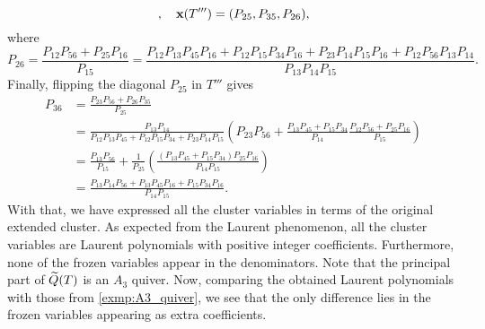 \begin{example}
\begin{equation*}
\begin{tikzcd}[sep=tiny, cells={nodes={font=\footnotesize}}]
		\end{tikzcd}
		,\quad \bx(T''') = (P_{25}, P_{35}, P_{26}),
	\end{equation*}
	where
	\begin{equation*}
		P_{26} = \frac{P_{12}P_{56} + P_{25}P_{16}}{P_{15}} = \frac{P_{12}P_{13}P_{45}P_{16} + P_{12}P_{15}P_{34}P_{16}+P_{23}P_{14}P_{15}P_{16} + P_{12}P_{56}P_{13}P_{14}}{P_{13}P_{14}P_{15}}.
	\end{equation*}
	Finally, flipping the diagonal $P_{25}$ in $T'''$ gives
	\begin{align*}
		P_{36}
		 & = \frac{P_{23}P_{56} + P_{26}P_{35}}{P_{25}}                                                                                                                                                      \\
		 & = \frac{P_{13}P_{14}}{P_{12}P_{13}P_{45} + P_{12}P_{15}P_{34}+P_{23}P_{14}P_{15}}\left(P_{23}P_{56} + \frac{P_{13}P_{45} + P_{15}P_{34}}{P_{14}}\frac{P_{12}P_{56} + P_{25}P_{16}}{P_{15}}\right) \\
		 & = \frac{P_{13}P_{56}}{P_{15}} + \frac{1}{P_{25}}\left(\frac{(P_{13}P_{45} + P_{15}P_{34})P_{25}P_{16}}{P_{14}P_{15}}\right)                                                                       \\
		 & =\frac{P_{13}P_{14}P_{56} + P_{13}P_{45}P_{16} + P_{15}P_{34}P_{16}}{P_{14}P_{15}}.
	\end{align*}
	With that, we have expressed all the cluster variables in terms of the original
	extended cluster. As expected from the Laurent phenomenon, all the cluster variables
	are Laurent polynomials with positive integer coefficients. Furthermore, none of the
	frozen variables appear in the denominators. Note that the principal part of $\widetilde{Q}(T)$
	is an $A_3$ quiver. Now, comparing the obtained Laurent polynomials with those from
	\cref{exmp:A3_quiver}, we see that the only difference lies in the frozen variables
	appearing as extra coefficients.
\end{example}

